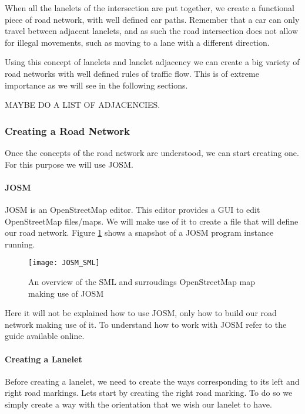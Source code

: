 When all the lanelets of the intersection are put together, we create a functional piece of road network, with well defined car paths. Remember that a car can only travel between adjacent lanelets, and as such the road intersection does not allow for illegal movements, such as moving to a lane with a different direction.

Using this concept of lanelets and lanelet adjacency we can create a big variety of road networks with well defined rules of traffic flow. This is of extreme importance as we will see in the following sections.

MAYBE DO A LIST OF ADJACENCIES.

\subsubsection{Creating a Road Network}

Once the concepts of the road network are understood, we can start creating one. For this purpose we will use JOSM.

\paragraph{JOSM}

JOSM\cite{JOSM} is an OpenStreetMap editor. This editor provides a GUI to edit OpenStreetMap files/maps. We will make use of it to create a file that will define our road network. Figure \ref{fig:josm_sml} shows a snapshot of a JOSM program instance running.

\begin{figure}[h!]
    \centering
    \texttt{[image: JOSM\_SML]}
    \caption{An overview of the SML and surroudings OpenStreetMap map making use of JOSM \label{fig:josm_sml} }
\end{figure}

Here it will not be explained how to use JOSM, only how to build our road network making use of it. To understand how to work with JOSM refer to the guide available online.

\paragraph{Creating a Lanelet}

Before creating a lanelet, we need to create the ways corresponding to its left and right road markings. Lets start by creating the right road marking. To do so we simply create a way with the orientation that we wish our lanelet to have.

